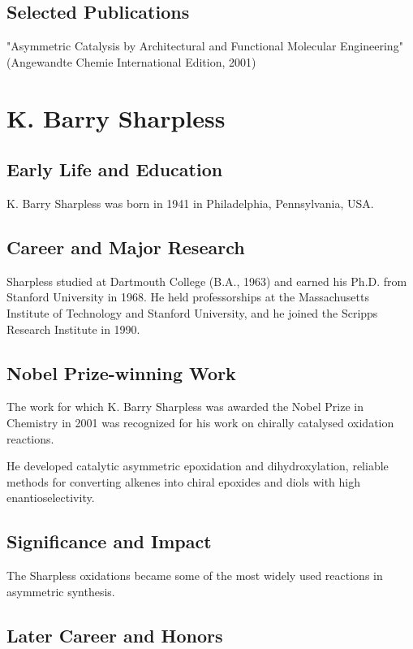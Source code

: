 \subsection*{Selected Publications}

"Asymmetric Catalysis by Architectural and Functional Molecular Engineering" (Angewandte Chemie International Edition, 2001)

\clearpage

\section{K. Barry Sharpless}

\subsection*{Early Life and Education}

K. Barry Sharpless was born in 1941 in Philadelphia, Pennsylvania, USA.

\subsection*{Career and Major Research}

Sharpless studied at Dartmouth College (B.A., 1963) and earned his Ph.D. from Stanford University in 1968. He held professorships at the Massachusetts Institute of Technology and Stanford University, and he joined the Scripps Research Institute in 1990.

\subsection*{Nobel Prize-winning Work}

The work for which K. Barry Sharpless was awarded the Nobel Prize in Chemistry in 2001 was recognized for his work on chirally catalysed oxidation reactions.

He developed catalytic asymmetric epoxidation and dihydroxylation, reliable methods for converting alkenes into chiral epoxides and diols with high enantioselectivity.

\subsection*{Significance and Impact}

The Sharpless oxidations became some of the most widely used reactions in asymmetric synthesis.

\subsection*{Later Career and Honors}

